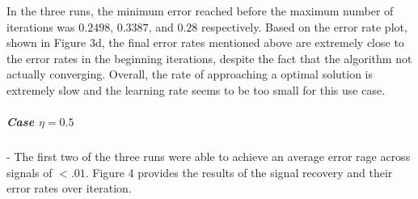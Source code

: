 \documentclass{article} %
\begin{document}
In the three runs, the minimum error reached before the maximum number of iterations was \(0.2498\), \(0.3387\), and \(0.28\) respectively. Based on the error rate plot, shown in Figure 3d, the final error rates mentioned above are extremely close to the error rates in the beginning iterations, despite the fact that the algorithm not actually converging. Overall, the rate of approaching a optimal solution is extremely slow and the learning rate seems to be too small for this use case.

\subparagraph{\textit{Case \(\eta=0.5\)}}- The first two of the three runs were able to achieve an average error rage across signals of \(<.01\). Figure 4 provides the results of the signal recovery and their error rates over iteration. 

\begin{figure}%
	\centering
    	\hfill%
        \hfill%
\end{figure}
\end{document}

